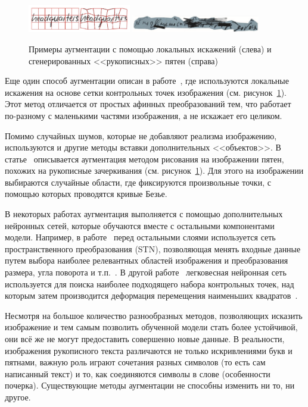 \begin{figure}[h!]
    \centering
    \includegraphics[width=0.4\textwidth]{img/aug_local}
    \includegraphics[width=0.5\textwidth]{img/aug_blots}
    \caption{Примеры аугментации с помощью локальных искажений (слева) и сгенерированных <<рукописных>> пятен (справа)}
    \label{fig:augmentation}
\end{figure}

Еще один способ аугментации описан в работе~\cite{wigington2017data}, где используются локальные искажения на основе сетки контрольных точек изображения (см. рисунок~\ref{fig:augmentation}).
Этот метод отличается от простых афинных преобразований тем, что работает по-разному с маленькими частями изображения, а не искажает его целиком.

Помимо случайных шумов, которые не добавляют реализма изображению, используются и другие методы вставки дополнительных <<объектов>>.
В статье~\cite{shonenkov2021stackmix} описывается аугментация методом рисования на изображении пятен, похожих на рукописные зачеркивания (см. рисунок~\ref{fig:augmentation}).
Для этого на изображении выбираются случайные области, где фиксируются произвольные точки, с помощью которых проводятся кривые Безье.

В некоторых работах аугментация выполняется с помощью дополнительных нейронных сетей, которые обучаются вместе с остальными компонентами модели.
Например, в работе~\cite{krishnan2018word} перед остальными слоями используется сеть пространственного преобразования (STN),
позволяющая менять входные данные путем выбора наиболее релевантных областей изображения и преобразования размера, угла поворота и т.п.~\cite{jaderberg2015spatial}.
В другой работе~\cite{luo2020learn} легковесная нейронная сеть используется для поиска наиболее подходящего набора
контрольных точек, над которым затем производится деформация перемещения наименьших квадратов~\cite{schaefer2006image}.

Несмотря на большое количество разнообразных методов, позволяющих исказить изображение и тем самым позволить обученной
модели стать более устойчивой, они всё же не могут предоставить совершенно новые данные.
В реальности, изображения рукописного текста различаются не только искривлениями букв и пятнами, важную роль играют
сочетания разных символов (то есть сам написанный текст) и то, как соединяются символы в слове (особенности почерка).
Существующие методы аугментации не способны изменить ни то, ни другое.

